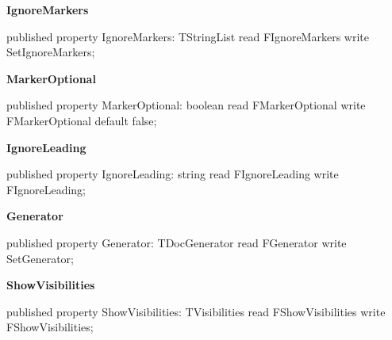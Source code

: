 \documentclass{report}
\newif\ifpdf
\begin{document}
\begin{list}{}
\begin{flushleft}
\ifpdf
\end{flushleft}
\fi


\par  \label{PasDoc_Base.TPasDoc-IgnoreMarkers}
\item[\textbf{IgnoreMarkers}\hfill]
\ifpdf
\begin{flushleft}
\fi
\begin{ttfamily}
published property IgnoreMarkers: TStringList read FIgnoreMarkers write SetIgnoreMarkers;\end{ttfamily}

\ifpdf
\end{flushleft}
\fi


\par  \label{PasDoc_Base.TPasDoc-MarkerOptional}
\item[\textbf{MarkerOptional}\hfill]
\ifpdf
\begin{flushleft}
\fi
\begin{ttfamily}
published property MarkerOptional: boolean read FMarkerOptional write FMarkerOptional
      default false;\end{ttfamily}

\ifpdf
\end{flushleft}
\fi


\par  \label{PasDoc_Base.TPasDoc-IgnoreLeading}
\item[\textbf{IgnoreLeading}\hfill]
\ifpdf
\begin{flushleft}
\fi
\begin{ttfamily}
published property IgnoreLeading: string read FIgnoreLeading write FIgnoreLeading;\end{ttfamily}

\ifpdf
\end{flushleft}
\fi


\par  \label{PasDoc_Base.TPasDoc-Generator}
\item[\textbf{Generator}\hfill]
\ifpdf
\begin{flushleft}
\fi
\begin{ttfamily}
published property Generator: TDocGenerator read FGenerator write SetGenerator;\end{ttfamily}

\ifpdf
\end{flushleft}
\fi


\par  \label{PasDoc_Base.TPasDoc-ShowVisibilities}
\item[\textbf{ShowVisibilities}\hfill]
\ifpdf
\begin{flushleft}
\fi
\begin{ttfamily}
published property ShowVisibilities: TVisibilities read FShowVisibilities write FShowVisibilities;\end{ttfamily}


\end{flushleft}
\end{list}
\end{document}
